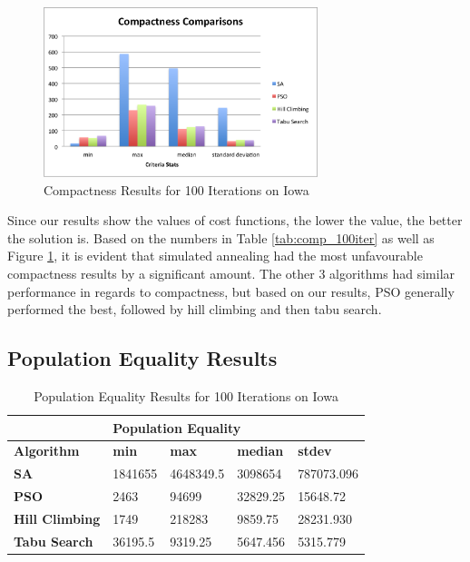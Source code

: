 \documentclass[journal]{IEEEtran}
\begin{document}
\begin{figure}[h!]
    \includegraphics[width=8cm]{images/compactness_graph.png}
    \centering
    \caption{Compactness Results for 100 Iterations on Iowa}
    \label{fig:compactness_results}
\end{figure}

Since our results show the values of cost functions, the lower the value, the better the solution is. Based on the numbers in Table \ref{tab:comp_100iter} as well as Figure \ref{fig:compactness_results}, it is evident that simulated annealing had the most unfavourable compactness results by a significant amount. The other 3 algorithms had similar performance in regards to compactness, but based on our results, PSO generally performed the best, followed by hill climbing and then tabu search.

\subsection{Population Equality Results}

\begin{table}[!h]
\centering
\caption{Population Equality Results for 100 Iterations on Iowa}
\label{tab:pop_100iter}
\begin{tabular}{l|llll}
                       & \multicolumn{4}{l}{\textbf{Population Equality}}             \\ \hline
\textbf{Algorithm}     & \textbf{min} & \textbf{max} & \textbf{median} & \textbf{stdev} \\ \hline
\textbf{SA}            & 1841655      & 4648349.5    & 3098654         & 787073.096         \\
\textbf{PSO}           & 2463         & 94699        & 32829.25        & 15648.72           \\
\textbf{Hill Climbing} & 1749         & 218283       & 9859.75         & 28231.930        \\
\textbf{Tabu Search}   & 36195.5      & 9319.25         & 5647.456       & 5315.779
\end{tabular}
\end{table}
\end{document}
